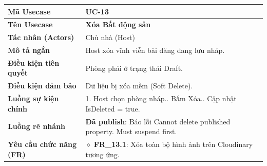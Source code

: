 \begin{table}[H]
\renewcommand{\arraystretch}{1.3}
\centering
\begin{tabularx}{\textwidth}{|p{4.5cm}|X|}
\hline
\cellcolor{gray!15}\bfseries Mã Usecase & \textbf{UC-13} \\ \hline
\cellcolor{gray!15}\bfseries Tên Usecase & \textbf{Xóa Bất động sản} \\ \hline
\cellcolor{gray!15}\bfseries Tác nhân (Actors) & Chủ nhà (Host) \\ \hline
\cellcolor{gray!15}\bfseries Mô tả ngắn & Host xóa vĩnh viễn bài đăng đang lưu nháp. \\ \hline
\cellcolor{gray!15}\bfseries Điều kiện tiên quyết & Phòng phải ở trạng thái Draft. \\ \hline
\cellcolor{gray!15}\bfseries Điều kiện đảm bảo & Dữ liệu bị xóa mềm (Soft Delete). \\ \hline
\cellcolor{gray!15}\bfseries Luồng sự kiện chính & 1. Host chọn phòng nháp.\newline 2. Bấm Xóa.\newline 3. Cập nhật IsDeleted = true. \\ \hline
\cellcolor{gray!15}\bfseries Luồng rẽ nhánh & \textbf{Đã publish}: Báo lỗi Cannot delete published property. Must suspend first. \\ \hline
\cellcolor{gray!15}\bfseries Yêu cầu chức năng (FR) & $\diamond$ \textbf{FR\_13.1}: Xóa toàn bộ hình ảnh trên Cloudinary tương ứng. \\ \hline
\end{tabularx}
\end{table}

